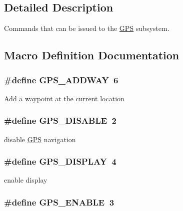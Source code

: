 \subsection{Detailed Description}
Commands that can be issued to the \hyperlink{classGPS}{G\-P\-S} subsystem. 

\subsection{Macro Definition Documentation}
\hypertarget{group__gps__commands_ga8fea9a175c11935b9e7cc3e2857621aa}{
\subsubsection[{G\-P\-S\-\_\-\-A\-D\-D\-W\-A\-Y}]{\setlength{\rightskip}{0pt plus 5cm}\#define G\-P\-S\-\_\-\-A\-D\-D\-W\-A\-Y~6}}\label{group__gps__commands_ga8fea9a175c11935b9e7cc3e2857621aa}
Add a waypoint at the current location \hypertarget{group__gps__commands_ga8e394314aacedb0790203d4af6cd5710}{
\subsubsection[{G\-P\-S\-\_\-\-D\-I\-S\-A\-B\-L\-E}]{\setlength{\rightskip}{0pt plus 5cm}\#define G\-P\-S\-\_\-\-D\-I\-S\-A\-B\-L\-E~2}}\label{group__gps__commands_ga8e394314aacedb0790203d4af6cd5710}
disable \hyperlink{classGPS}{G\-P\-S} navigation \hypertarget{group__gps__commands_gad25ca4dcc3aa69da0e474e3b69cc910a}{
\subsubsection[{G\-P\-S\-\_\-\-D\-I\-S\-P\-L\-A\-Y}]{\setlength{\rightskip}{0pt plus 5cm}\#define G\-P\-S\-\_\-\-D\-I\-S\-P\-L\-A\-Y~4}}\label{group__gps__commands_gad25ca4dcc3aa69da0e474e3b69cc910a}
enable display \hypertarget{group__gps__commands_gac8383d8fc4fa97bb45f89d9a50e0966d}{
\subsubsection[{G\-P\-S\-\_\-\-E\-N\-A\-B\-L\-E}]{\setlength{\rightskip}{0pt plus 5cm}\#define G\-P\-S\-\_\-\-E\-N\-A\-B\-L\-E~3}}\label{group__gps__commands_gac8383d8fc4fa97bb45f89d9a50e0966d}
